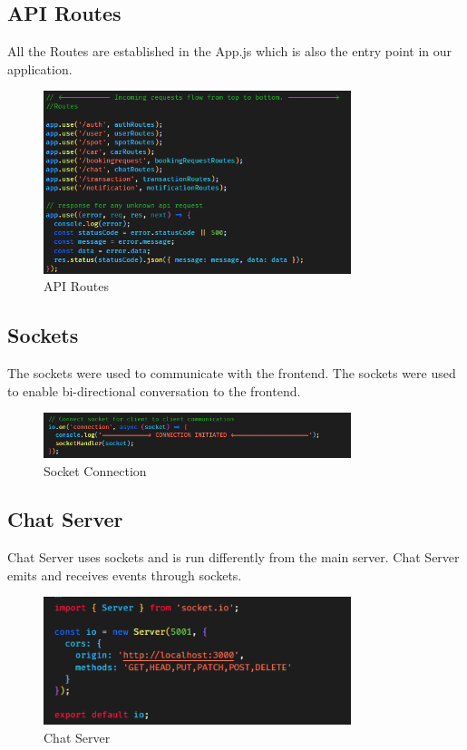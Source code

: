     \pagebreak

    \subsection{API Routes}
        All the Routes are established in the App.js which is also the entry point in our application.
    \begin{figure}[h]
        \centering
        \includegraphics[width=0.8\textwidth]{images/BE_Routes.png}
        \caption{API Routes}
        \label{fig:BE_Routes}
    \end{figure}

    \pagebreak

    \subsection{Sockets}
    The sockets were used to communicate with the frontend. The sockets were used to enable bi-directional conversation to the frontend.\\

    \begin{figure}[h]
        \centering
        \includegraphics[width=0.8\textwidth]{images/socketConnection.png}
        \caption{Socket Connection}
        \label{fig:socketConnection}
    \end{figure}

    \subsection{Chat Server}
    Chat Server uses sockets and is run differently from the main server. Chat Server emits and receives events through sockets.
    \begin{figure}[h]
        \centering
        \includegraphics[width=0.8\textwidth]{images/chatServer.png}
        \caption{Chat Server}
        \label{fig:chatServer}
    \end{figure}

